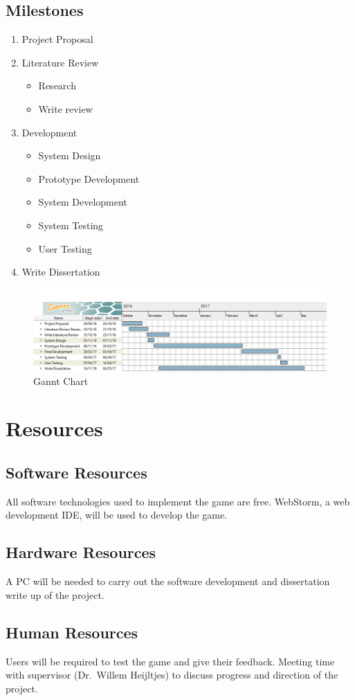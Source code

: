 \documentclass[12pt,a4paper]{report}
\begin{document}
\section{Milestones}
\begin{enumerate}
  \item Project Proposal
  \item Literature Review
  \begin{itemize}
  \item Research
  \item Write review
  \end{itemize}
  \item Development
  \begin{itemize}
  \item System Design
  \item Prototype Development
  \item System Development
  \item System Testing
  \item User Testing
  \end{itemize}
  \item Write Dissertation
\end{enumerate}

\begin{figure}[h]
\caption{Gannt Chart}
\centering
\label{fig:ganntchart}
\includegraphics[width=\textwidth,height=\textheight,keepaspectratio]{Gantt}
\end{figure}

{\let\clearpage\relax \chapter{Resources}}
\section{Software Resources}
All software technologies used to implement the game are free. WebStorm, a web development IDE, will be used to develop the game.

\section{Hardware Resources}
A PC will be needed to carry out the software development and dissertation write up of the project. 

\section{Human Resources}
Users will be required to test the game and give their feedback. 
Meeting time with supervisor (Dr.~Willem Heijltjes) to discuss progress and direction of the project.


 
\end{document}
